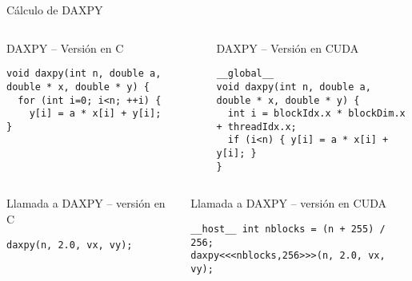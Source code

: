 \begin{frame}[t,fragile]{Cálculo de DAXPY}
\begin{columns}[T]

\begin{block}{DAXPY -- Versión en C}
\begin{lstlisting}
void daxpy(int n, double a, double * x, double * y) {
  for (int i=0; i<n; ++i) {
    y[i] = a * x[i] + y[i];
}
\end{lstlisting}
\end{block}

\pause
{}
\begin{block}{DAXPY -- Versión en CUDA}
\begin{lstlisting}[morekeywords=__global__]
__global__
void daxpy(int n, double a, double * x, double * y) {
  int i = blockIdx.x * blockDim.x + threadIdx.x;
  if (i<n) { y[i] = a * x[i] + y[i]; }
}
\end{lstlisting}
\end{block}
\end{columns}

\begin{columns}[T]

\begin{block}{Llamada a DAXPY -- versión en C}
\begin{lstlisting}
daxpy(n, 2.0, vx, vy);
\end{lstlisting}
\end{block}

\pause
{}
\begin{block}{Llamada a DAXPY -- versión en CUDA}
\begin{lstlisting}[morekeywords=__global__]
__host__ int nblocks = (n + 255) / 256;
daxpy<<<nblocks,256>>>(n, 2.0, vx, vy);
\end{lstlisting}
\end{block}
\end{columns}

\end{frame}

